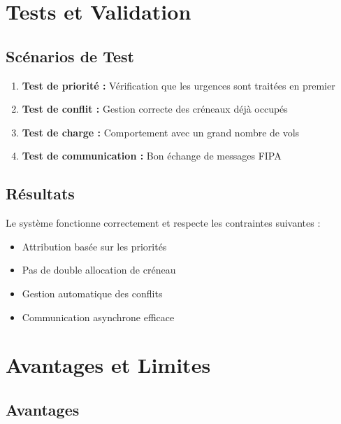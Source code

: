\documentclass[12pt,a4paper]{article}
\begin{document}
\section{Tests et Validation}

\subsection{Scénarios de Test}

\begin{enumerate}[leftmargin=*, label=\textcolor{primaryblue}{\textbf{\arabic*.}}]
    \item \textbf{Test de priorité :} Vérification que les urgences sont traitées en premier
    \item \textbf{Test de conflit :} Gestion correcte des créneaux déjà occupés
    \item \textbf{Test de charge :} Comportement avec un grand nombre de vols
    \item \textbf{Test de communication :} Bon échange de messages FIPA
\end{enumerate}

\subsection{Résultats}

\begin{tcolorbox}[colback=green!10, colframe=green!60!black, title=\textbf{Validation du Système}]
Le système fonctionne correctement et respecte les contraintes suivantes :
\begin{itemize}[leftmargin=*]
    \item[$\checkmark$] Attribution basée sur les priorités
    \item[$\checkmark$] Pas de double allocation de créneau
    \item[$\checkmark$] Gestion automatique des conflits
    \item[$\checkmark$] Communication asynchrone efficace
\end{itemize}
\end{tcolorbox}

\section{Avantages et Limites}

\subsection{Avantages}
\end{document}
